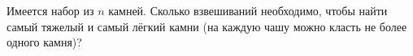 Имеется набор из $n$ камней. Сколько взвешиваний необходимо, чтобы найти самый тяжелый и самый лёгкий
камни (на каждую чашу можно класть не более одного камня)?
